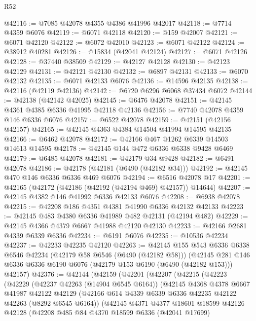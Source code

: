 \begin{lexlean}{R52}
\begin{coremodule}
@42116 := @7085 @42078 @4355 @4386 @41996 @42017
@42118 := @7714 @4359 @6076
@42119 := @6071 @42118
@42120 := @159 @42007
@42121 := @6071 @42120
@42122 := @6072 @42010
@42123 := @6071 @42122
@42124 := @38912 @40281
@42126 := @15834 (@42041 @42124)
@42127 := @6071 @42126
@42128 := @37440 @38509
@42129 := @42127 @42128
@42130 := @42123 @42129
@42131 := @42121 @42130
@42132 := @6897 @42131
@42133 := @6070 @42132
@42135 := @6071 @42133 @6076
@42136 := @14596 @42135
@42138 := @42116 (@42119 @42136)
@42142 := @6720 @6296 @6068 @37434 @6072
@42144 := @42138 (@42142 @42025)
@42145 := @6476 @42078
@42151 := @42145 @4361 @4385 @6336 @41995 @42118 @42136
@42156 := @7740 @42078 @4359 @146 @6336 @6076
@42157 := @6522 @42078
@42159 := @42151 (@42156 @42157)
@42165 := @42145 @4363 @4384 @14504 @41994 @14595 @42135
@42166 := @6462 @42078
@42172 := @42166 @467 @1262 @6339 @14503 @14613 @14595
@42178 := @42145 @144 @472 @6336 @6338 @9428 @6469
@42179 := @6485 @42078
@42181 := @42179 @34 @9428
@42182 := @6491 @42078
@42186 := @42178 (@42181 (@6490 (@42182 @34)))
@42192 := @42145 @470 @146 @6336 @6336 @469 @6076
@42194 := @6516 @42078 @17
@42201 := @42165 (@42172 (@42186 (@42192 (@42194 @469) @42157)) @14644)
@42207 := @42145 @4382 @146 @41992 @6336 @42133 @6076
@42208 := @6938 @42078
@42215 := @42208 @186 @4351 @4381 @41990 @6336 @42132 @42133
@42223 := @42145 @483 @4380 @6336 @41989 @482 @42131 (@42194 @482)
@42229 := @42145 @4366 @4379 @6667 @41988 @42120 @42130
@42233 := @42166 @2681 @4339 @6339 @6336
@42234 := @6191 @6076
@42235 := @10536 @42234
@42237 := @42233 @42235 @42120
@42263 := @42145
    @155
    @543
    @6336
    @6338
    @6546
    @42234
    (@42179 @58 @6546 (@6490 (@42182 @58)))
    (@42145 @281 @146 @6336 @6336 @6190 @6076 (@42179 @153 @6190 (@6490 (@42182 @153))) @42157)
@42376 := @42144
    (@42159
      (@42201
        (@42207
          (@42215
            (@42223
              (@42229
                (@42237 @42263 (@14904 @6545 @6164))
                (@42145
                  @4368
                  @4378
                  @6667
                  @41987
                  @42122
                  @42129
                  (@42166 @614 @4339 @6339 @6336 @42235 @42122 @42263 (@8292 @6545 @6164))
                  (@42145
                    @4371
                    @4377
                    @18601
                    @18599
                    @42126
                    @42128
                    (@42208
                      @485
                      @84
                      @4370
                      @18599
                      @6336
                      (@42041 @17699)

\end{coremodule}
\end{lexlean}
